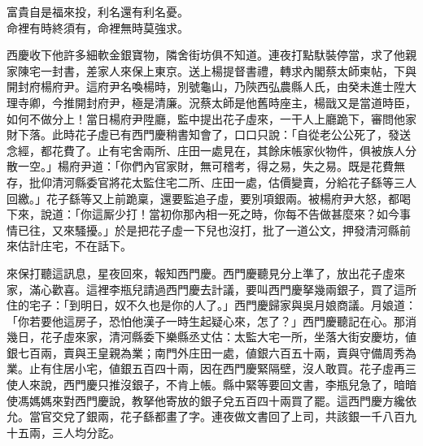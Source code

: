 \begin{myquote}
富貴自是福來投，利名還有利名憂。\\命裡有時終須有，命裡無時莫強求。
\end{myquote}

西慶收下他許多細軟金銀寶物，隣舍街坊俱不知道。連夜打點馱裝停當，求了他親家陳宅一封書，差家人來保上東京。送上楊提督書禮，轉求內閣蔡太師柬帖，下與開封府楊府尹。這府尹名喚楊時，別號龜山，乃陝西弘農縣人氏，由癸未進士陞大理寺卿，今推開封府尹，極是清廉。況蔡太師是他舊時座主，楊戩又是當道時臣，如何不做分上！{}當日楊府尹陞廳，監中提出花子虛來，一干人上廳跪下，審問他家財下落。此時花子虛已有西門慶稍書知會了，口口只說：「自從老公公死了，發送念經，都花費了。止有宅舍兩所、庄田一處見在，其餘床帳家伙物件，俱被族人分散一空。」楊府尹道：「你們內官家財，無可稽考，得之易，失之易。既是花費無存，批仰清河縣委官將花太監住宅二所、庄田一處，估價變賣，分給花子繇等三人回繳。」花子繇等又上前跪稟，還要監追子虛，要別項銀兩。被楊府尹大怒，都喝下來，說道：「你這厮少打！當初你那內相一死之時，你每不告做甚麼來？如今事情已往，又來騷擾。」於是把花子虛一下兒也沒打，批了一道公文，押發清河縣前來估計庄宅，不在話下。

來保打聽這訊息，星夜回來，報知西門慶。西門慶聽見分上準了，放出花子虛來家，滿心歡喜。這裡李瓶兒請過西門慶去計議，要叫西門慶拏幾兩銀子，買了這所住的宅子：「到明日，奴不久也是你的人了。」{}西門慶歸家與吳月娘商議。月娘道：「你若要他這房子，恐怕他漢子一時生起疑心來，怎了？」西門慶聽記在心。那消幾日，花子虛來家，清河縣委下樂縣丞丈估：太監大宅一所，坐落大街安慶坊，値銀七百兩，賣與王皇親為業；南門外庄田一處，値銀六百五十兩，賣與守備周秀為業。止有住居小宅，値銀五百四十兩，因在西門慶緊隔壁，沒人敢買。花子虛再三使人來說，西門慶只推沒銀子，不肯上帳。縣中緊等要回文書，李瓶兒急了，暗暗使馮媽媽來對西門慶說，教拏他寄放的銀子兌五百四十兩買了罷。這西門慶方纔依允。當官交兌了銀兩，花子繇都畫了字。連夜做文書回了上司，共該銀一千八百九十五兩，三人均分訖。

